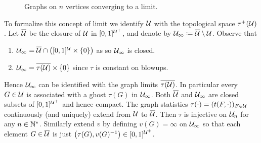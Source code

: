 \documentclass{article}
\begin{document}
\begin{figure}
  \centering

\caption{Graphs on $n$ vertices converging to a limit.}
  \label{fig:convergence}
\end{figure}

To formalize this concept of limit we identify $\Ug$ with the topological space $\tau^{+}(\Ug)$. Let $\Ug*$ be the closure of $\Ug$ in $[0,1]^{\Ug^+}$, and denote by $\Ug_{\infty} \coloneqq \Ug*\setminus \Ug$. Observe that 
\begin{enumerate}
  \item $\Ug_{\infty} = \Ug* \cap  \left( [0,1]^{\Ug}\times \set{0} \right)$ as so $\Ug_\infty$ is closed.
  \item $\Ug_{\infty} = \overline{\tau(\Ug)} \times \set{0}$ since $\tau$ is constant on blowups. 
\end{enumerate}

Hence $\Ug_{\infty}$ can be identified with the graph limits $\overline{\tau(\Ug)}$. In particular every $G \in \Ug$ is associated with a ghost $\tau(G)$ in $\Ug_{\infty}$. Both $\Ug*$ and $\Ug_{\infty}$ are closed subsets of $[0,1]^{\Ug^+}$ and hence compact. The graph statistics $\tau(\cdot) = (t(F, \cdot))_{F \in \Ug}$ continuously (and uniquely) extend from $\Ug$ to $\Ug*$. Then $\tau$ is injective on $\Ug_{n}$ for any $n \in \N*$. Similarly extend $v$ by defining $v(G) = \infty$ on $\Ug_{\infty}$ so that each element $G \in \Ug*$ is just $\left( \tau(G), v(G)^{-1} \right) \in [0,1]^{\Ug^+}$.
 
\end{document}
